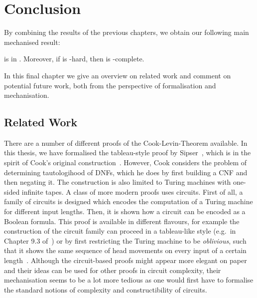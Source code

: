 \chapter{Conclusion}\label{chap:conclusion}
By combining the results of the previous chapters, we obtain our following main mechanised result: 
\begin{theorem}
  \gennp{} is in \NP{}. Moreover, if \gennp{} is \NP{}-hard, then \SAT{} is \NP{}-complete.
\end{theorem}

In this final chapter we give an overview on related work and comment on potential future work, both from the perspective of formalisation and mechanisation.

\section{Related Work}
There are a number of different proofs of the Cook-Levin-Theorem available. In this thesis, we have formalised the tableau-style proof by Sipser~\cite[Chapter~7.4]{Sipser:TheoryofComputation}, which is in the spirit of Cook's original construction~\cite{cook_theorem}. However, Cook considers the problem of determining tautologihood of DNFs, which he does by first building a CNF and then negating it. The construction is also limited to Turing machines with one-sided infinite tapes.
A class of more modern proofs uses circuits. First of all, a family of circuits is designed which encodes the computation of a Turing machine for different input lengths. Then, it is shown how a circuit can be encoded as a Boolean formula. This proof is available in different flavours, for example the construction of the circuit family can proceed in a tableau-like style (e.g.\ in Chapter 9.3 of~\cite{Sipser:TheoryofComputation}) or by first restricting the Turing machine to be \emph{oblivious}, such that it shows the same sequence of head movements on every input of a certain length~\cite[p.~199ff]{Bläser:TISkript}. 
Although the circuit-based proofs might appear more elegant on paper and their ideas can be used for other proofs in circuit complexity, their mechanisation seems to be a lot more tedious as one would first have to formalise the standard notions of complexity and constructibility of circuits. 

